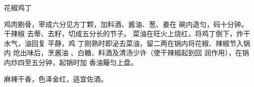 \begin{recipe}{花椒鸡丁}

\ingredients



\cooking

鸡肉剔骨，宰成六分见方丁颗，加料酒、酱油、葱、姜在 碗内造匀，码十分钟。干辣椒
去蒂、去籽，切成五分长的节子。 菜油在旺火上烧红，将鸡丁倒下，炸干水气，油回复
平静，鸡 丁刚熟时即泌去菜油，留二两在锅内将花椒、辣椒节入锅内 炝出味后，烹酱油
、白糖、料酒及清汤少许（使干辣椒起到回 润作用），在锅内炒四至五分钟，起锅时加
香油簸匀上盘。

\notes

麻辣干香，色泽金红，适宜佐酒。

\end{recipe}

